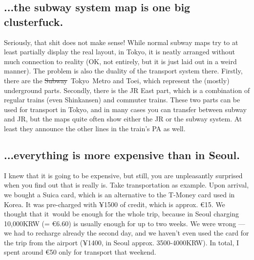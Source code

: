 \begin{post}
\begin{content}
\subsection{...the subway system map is one big clusterfuck.}
\begin{figure}
\vspace{-12pt}
\centering{}
\vspace{-24pt}
\end{figure}Seriously, that shit does not make sense! While normal subway maps try to at least partially display the real layout, in Tokyo, it is neatly arranged without much connection to reality (OK, not entirely, but it is just laid out in a weird manner). The problem is also the duality of the transport system there. Firstly, there are the \sout{Subway} Tokyo Metro and Toei, which represent the (mostly) underground parts. Secondly, there is the JR East part, which is a combination of regular trains (even Shinkansen) and commuter trains. These two parts can be used for transport in Tokyo, and in many cases you can transfer between subway and JR, but the maps quite often show either the JR or the subway system. At least they announce the other lines in the train's PA as well.

\subsection{...everything is more expensive than in Seoul. }
I knew that it is going to be expensive, but still, you are unpleasantly surprised when you find out that is really is. Take transportation as example. Upon arrival, we bought a Suica card, which is an alternative to the T-Money card used in Korea. It was pre-charged with ¥1500 of credit, which is approx. €15. We thought that it would be enough for the whole trip, because in Seoul charging 10,000KRW (= €6.60) is usually enough for up to two weeks. We were wrong — we had to recharge already the second day, and we haven't even used the card for the trip from the airport (¥1400, in Seoul approx. 3500-4000KRW). In total, I spent around €50 only for transport that weekend.


\end{content}
\end{post}
